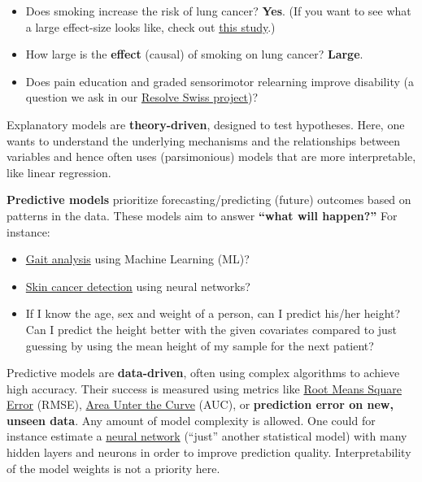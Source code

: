 \documentclass[
]{book}
\providecommand{\tightlist}{%
  \setlength{\itemsep}{0pt}\setlength{\parskip}{0pt}}
\begin{document}
\begin{itemize}
\tightlist
\item
  Does smoking increase the risk of lung cancer? \textbf{Yes}. (If you want to see what a large effect-size looks like, check out \href{https://bmjopen.bmj.com/content/bmjopen/8/10/e021611.full.pdf}{this study}.)
\item
  How large is the \textbf{effect} (causal) of smoking on lung cancer? \textbf{Large}.
\item
  Does pain education and graded sensorimotor relearning improve disability (a question we ask in
  our \href{https://data.snf.ch/grants/grant/220585}{Resolve Swiss project})?
\end{itemize}

Explanatory models are \textbf{theory-driven}, designed to test hypotheses. Here, one wants to understand the underlying
mechanisms and the relationships between variables and hence often uses (parsimonious) models that are more interpretable,
like linear regression.

\textbf{Predictive models} prioritize forecasting/predicting (future) outcomes based on patterns in the data.
These models aim to answer \textbf{``what will happen?''} For instance:

\begin{itemize}
\tightlist
\item
  \href{https://www.tandfonline.com/doi/abs/10.1080/03091902.2020.1822940}{Gait analysis} using Machine Learning (ML)?
\item
  \href{https://jamanetwork.com/journals/jamadermatology/fullarticle/2756346}{Skin cancer detection} using neural networks?
\item
  If I know the age, sex and weight of a person, can I predict his/her height?
  Can I predict the height better with the given covariates compared to just
  guessing by using the mean height of my sample for the next patient?
\end{itemize}

Predictive models are \textbf{data-driven}, often using complex algorithms to achieve high accuracy.
Their success is measured using metrics like \href{https://computersciencewiki.org/index.php/Root-mean-square_error_(RMSE)}{Root Means Square Error}
(RMSE), \href{https://en.wikipedia.org/wiki/Receiver_operating_characteristic\#:~:text=The\%20area\%20under\%20the\%20curve,ranks\%20higher\%20than\%20'negative'}{Area Unter the Curve}
(AUC), or \textbf{prediction error on new, unseen data}.
Any amount of model complexity is allowed. One could for instance estimate a
\href{https://en.wikipedia.org/wiki/Neural_network_(machine_learning)}{neural network} (``just'' another statistical model)
with many hidden layers and neurons in order to improve prediction quality. Interpretability of the model weights is not a priority here.
\end{document}
